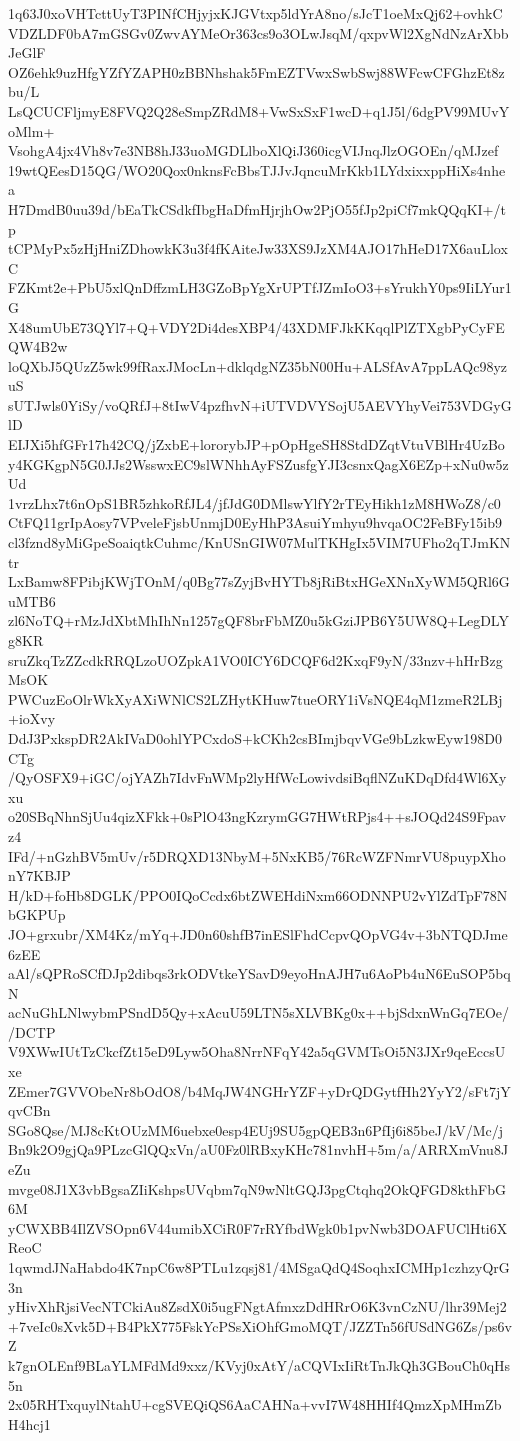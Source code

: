 1q63J0xoVHTcttUyT3PINfCHjyjxKJGVtxp5ldYrA8no/sJcT1oeMxQj62+ovhkC
VDZLDF0bA7mGSGv0ZwvAYMeOr363cs9o3OLwJsqM/qxpvWl2XgNdNzArXbbJeGlF
OZ6ehk9uzHfgYZfYZAPH0zBBNhshak5FmEZTVwxSwbSwj88WFcwCFGhzEt8zbu/L
LsQCUCFljmyE8FVQ2Q28eSmpZRdM8+VwSxSxF1wcD+q1J5l/6dgPV99MUvYoMlm+
VsohgA4jx4Vh8v7e3NB8hJ33uoMGDLlboXlQiJ360icgVIJnqJlzOGOEn/qMJzef
19wtQEesD15QG/WO20Qox0nknsFcBbsTJJvJqncuMrKkb1LYdxixxppHiXs4nhea
H7DmdB0uu39d/bEaTkCSdkfIbgHaDfmHjrjhOw2PjO55fJp2piCf7mkQQqKI+/tp
tCPMyPx5zHjHniZDhowkK3u3f4fKAiteJw33XS9JzXM4AJO17hHeD17X6auLloxC
FZKmt2e+PbU5xlQnDffzmLH3GZoBpYgXrUPTfJZmIoO3+sYrukhY0ps9IiLYur1G
X48umUbE73QYl7+Q+VDY2Di4desXBP4/43XDMFJkKKqqlPlZTXgbPyCyFEQW4B2w
loQXbJ5QUzZ5wk99fRaxJMocLn+dklqdgNZ35bN00Hu+ALSfAvA7ppLAQc98yzuS
sUTJwls0YiSy/voQRfJ+8tIwV4pzfhvN+iUTVDVYSojU5AEVYhyVei753VDGyGlD
EIJXi5hfGFr17h42CQ/jZxbE+lororybJP+pOpHgeSH8StdDZqtVtuVBlHr4UzBo
y4KGKgpN5G0JJs2WsswxEC9slWNhhAyFSZusfgYJI3csnxQagX6EZp+xNu0w5zUd
1vrzLhx7t6nOpS1BR5zhkoRfJL4/jfJdG0DMlswYlfY2rTEyHikh1zM8HWoZ8/c0
CtFQ11grIpAosy7VPveleFjsbUnmjD0EyHhP3AsuiYmhyu9hvqaOC2FeBFy15ib9
cl3fznd8yMiGpeSoaiqtkCuhmc/KnUSnGIW07MulTKHgIx5VIM7UFho2qTJmKNtr
LxBamw8FPibjKWjTOnM/q0Bg77sZyjBvHYTb8jRiBtxHGeXNnXyWM5QRl6GuMTB6
zl6NoTQ+rMzJdXbtMhIhNn1257gQF8brFbMZ0u5kGziJPB6Y5UW8Q+LegDLYg8KR
sruZkqTzZZcdkRRQLzoUOZpkA1VO0ICY6DCQF6d2KxqF9yN/33nzv+hHrBzgMsOK
PWCuzEoOlrWkXyAXiWNlCS2LZHytKHuw7tueORY1iVsNQE4qM1zmeR2LBj+ioXvy
DdJ3PxkspDR2AkIVaD0ohlYPCxdoS+kCKh2csBImjbqvVGe9bLzkwEyw198D0CTg
/QyOSFX9+iGC/ojYAZh7IdvFnWMp2lyHfWcLowivdsiBqflNZuKDqDfd4Wl6Xyxu
o20SBqNhnSjUu4qizXFkk+0sPlO43ngKzrymGG7HWtRPjs4++sJOQd24S9Fpavz4
IFd/+nGzhBV5mUv/r5DRQXD13NbyM+5NxKB5/76RcWZFNmrVU8puypXhonY7KBJP
H/kD+foHb8DGLK/PPO0IQoCcdx6btZWEHdiNxm66ODNNPU2vYlZdTpF78NbGKPUp
JO+grxubr/XM4Kz/mYq+JD0n60shfB7inESlFhdCcpvQOpVG4v+3bNTQDJme6zEE
aAl/sQPRoSCfDJp2dibqs3rkODVtkeYSavD9eyoHnAJH7u6AoPb4uN6EuSOP5bqN
acNuGhLNlwybmPSndD5Qy+xAcuU59LTN5sXLVBKg0x++bjSdxnWnGq7EOe//DCTP
V9XWwIUtTzCkcfZt15eD9Lyw5Oha8NrrNFqY42a5qGVMTsOi5N3JXr9qeEccsUxe
ZEmer7GVVObeNr8bOdO8/b4MqJW4NGHrYZF+yDrQDGytfHh2YyY2/sFt7jYqvCBn
SGo8Qse/MJ8cKtOUzMM6uebxe0esp4EUj9SU5gpQEB3n6PfIj6i85beJ/kV/Mc/j
Bn9k2O9gjQa9PLzcGlQQxVn/aU0Fz0lRBxyKHc781nvhH+5m/a/ARRXmVnu8JeZu
mvge08J1X3vbBgsaZIiKshpsUVqbm7qN9wNltGQJ3pgCtqhq2OkQFGD8kthFbG6M
yCWXBB4IlZVSOpn6V44umibXCiR0F7rRYfbdWgk0b1pvNwb3DOAFUClHti6XReoC
1qwmdJNaHabdo4K7npC6w8PTLu1zqsj81/4MSgaQdQ4SoqhxICMHp1czhzyQrG3n
yHivXhRjsiVecNTCkiAu8ZsdX0i5ugFNgtAfmxzDdHRrO6K3vnCzNU/lhr39Mej2
+7veIc0sXvk5D+B4PkX775FskYcPSsXiOhfGmoMQT/JZZTn56fUSdNG6Zs/ps6vZ
k7gnOLEnf9BLaYLMFdMd9xxz/KVyj0xAtY/aCQVIxIiRtTnJkQh3GBouCh0qHs5n
2x05RHTxquylNtahU+cgSVEQiQS6AaCAHNa+vvI7W48HHIf4QmzXpMHmZbH4hcj1
